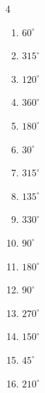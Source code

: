 \begin{multicols}{4}
\begin{enumerate}
\columnbreak %

  \item $\displaystyle 60^{\circ}$

  \item $\displaystyle 315^{\circ}$

  \item $\displaystyle 120^{\circ}$

  \item $\displaystyle 360^{\circ}$
        \phantom{$\displaystyle =2\pi$}

  \item $\displaystyle 180^{\circ}$
        \phantom{$\displaystyle =\pi$}

  \item $\displaystyle 30^{\circ}$

  \item $\displaystyle 315^{\circ}$

  \item $\displaystyle 135^{\circ}$

  \item $\displaystyle 330^{\circ}$

  \item $\displaystyle 90^{\circ}$

  \item $\displaystyle 180^{\circ}$
        \phantom{$\displaystyle =\pi$}

  \item $\displaystyle 90^{\circ}$

  \item $\displaystyle 270^{\circ}$

  \item $\displaystyle 150^{\circ}$

  \item $\displaystyle 45^{\circ}$

  \item $\displaystyle 210^{\circ}$


\end{enumerate}
\end{multicols}
